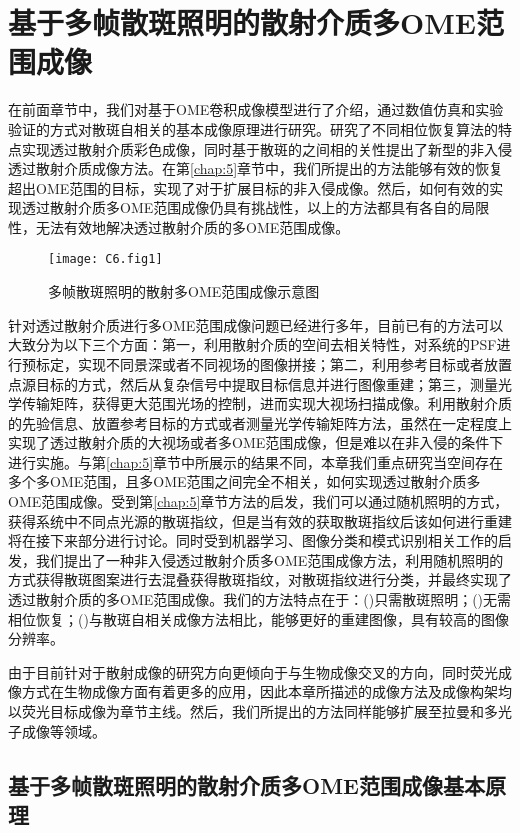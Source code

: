 
\chapter{基于多帧散斑照明的散射介质多OME范围成像}

在前面章节中，我们对基于OME卷积成像模型进行了介绍，通过数值仿真和实验验证的方式对散斑自相关的基本成像原理进行研究。研究了不同相位恢复算法的特点实现透过散射介质彩色成像，同时基于散斑的之间相的关性提出了新型的非入侵透过散射介质成像方法。在第\ref{chap:5}章节中，我们所提出的方法能够有效的恢复超出OME范围的目标，实现了对于扩展目标的非入侵成像。然后，如何有效的实现透过散射介质多OME范围成像仍具有挑战性，以上的方法都具有各自的局限性，无法有效地解决透过散射介质的多OME范围成像。

\begin{figure}[htp]
	\centering
	\texttt{[image: C6.fig1]}
	\caption{多帧散斑照明的散射多OME范围成像示意图}
	\label{fig:6.1}
\end{figure}

针对透过散射介质进行多OME范围成像问题已经进行多年，目前已有的方法可以大致分为以下三个方面：第一，利用散射介质的空间去相关特性，对系统的PSF进行预标定，实现不同景深或者不同视场的图像拼接；第二，利用参考目标或者放置点源目标的方式，然后从复杂信号中提取目标信息并进行图像重建；第三，测量光学传输矩阵，获得更大范围光场的控制，进而实现大视场扫描成像。利用散射介质的先验信息、放置参考目标的方式或者测量光学传输矩阵方法，虽然在一定程度上实现了透过散射介质的大视场或者多OME范围成像，但是难以在非入侵的条件下进行实施。与第\ref{chap:5}章节中所展示的结果不同，本章我们重点研究当空间存在多个多OME范围，且多OME范围之间完全不相关，如何实现透过散射介质多OME范围成像。受到第\ref{chap:5}章节方法的启发，我们可以通过随机照明的方式，获得系统中不同点光源的散斑指纹，但是当有效的获取散斑指纹后该如何进行重建将在接下来部分进行讨论。同时受到机器学习、图像分类和模式识别相关工作的启发，我们提出了一种非入侵透过散射介质多OME范围成像方法，利用随机照明的方式获得散斑图案进行去混叠获得散斑指纹，对散斑指纹进行分类，并最终实现了透过散射介质的多OME范围成像。我们的方法特点在于：()只需散斑照明；()无需相位恢复；()与散斑自相关成像方法相比，能够更好的重建图像，具有较高的图像分辨率。

由于目前针对于散射成像的研究方向更倾向于与生物成像交叉的方向，同时荧光成像方式在生物成像方面有着更多的应用，因此本章所描述的成像方法及成像构架均以荧光目标成像为章节主线。然后，我们所提出的方法同样能够扩展至拉曼和多光子成像等领域。

\section{基于多帧散斑照明的散射介质多OME范围成像基本原理}

